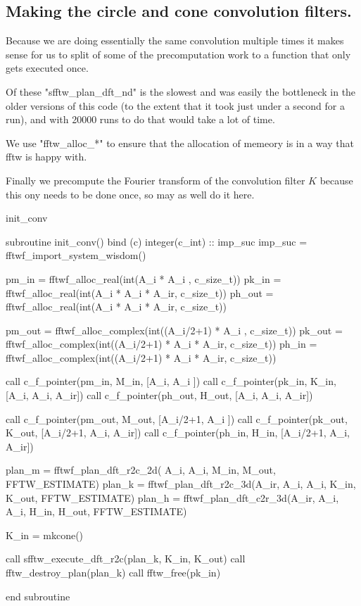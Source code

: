 \documentclass[10pt, a4paper]{article}
\begin{document}
\subsection{Making the circle and cone convolution filters.}

Because we are doing essentially the same convolution multiple times it makes sense for us to split of some of the precomputation work to a function that only gets executed once. 

Of these "sfftw_plan_dft_nd" is the slowest and was easily the bottleneck in the older versions of this code (to the extent that it took just under a second for a run), and with 20000 runs to do that would take a lot of time. 

We use "fftw_alloc_*" to ensure that the allocation of memeory is in a way that fftw is happy with.

Finally we precompute the Fourier transform of the convolution filter $K$ because this ony needs to be done once, so may as well do it here. 

\begin{codeblock}{init_conv}
\begin{code}
subroutine init_conv() bind (c)
	integer(c_int) :: imp_suc
	imp_suc = fftwf_import_system_wisdom()
	
	pm_in  = fftwf_alloc_real(int(A_i * A_i       , c_size_t))
	pk_in  = fftwf_alloc_real(int(A_i * A_i * A_ir, c_size_t))
	ph_out = fftwf_alloc_real(int(A_i * A_i * A_ir, c_size_t))
	
	pm_out = fftwf_alloc_complex(int((A_i/2+1) * A_i       , c_size_t))
	pk_out = fftwf_alloc_complex(int((A_i/2+1) * A_i * A_ir, c_size_t))
	ph_in  = fftwf_alloc_complex(int((A_i/2+1) * A_i * A_ir, c_size_t))
	
	call c_f_pointer(pm_in,  M_in,  [A_i, A_i      ])
	call c_f_pointer(pk_in,  K_in,  [A_i, A_i, A_ir])
	call c_f_pointer(ph_out, H_out, [A_i, A_i, A_ir])
	
	call c_f_pointer(pm_out, M_out, [A_i/2+1, A_i    ])
	call c_f_pointer(pk_out, K_out, [A_i/2+1, A_i, A_ir])
	call c_f_pointer(ph_in,  H_in,  [A_i/2+1, A_i, A_ir])

	plan_m = fftwf_plan_dft_r2c_2d(      A_i, A_i, M_in, M_out, FFTW_ESTIMATE)
	plan_k = fftwf_plan_dft_r2c_3d(A_ir, A_i, A_i, K_in, K_out, FFTW_ESTIMATE)
	plan_h = fftwf_plan_dft_c2r_3d(A_ir, A_i, A_i, H_in, H_out, FFTW_ESTIMATE)
	
	K_in = mkcone()
	
	call sfftw_execute_dft_r2c(plan_k, K_in, K_out)
	call fftw_destroy_plan(plan_k)
	call fftw_free(pk_in)
	
end subroutine
\end{code}
\end{codeblock}
\end{document}
